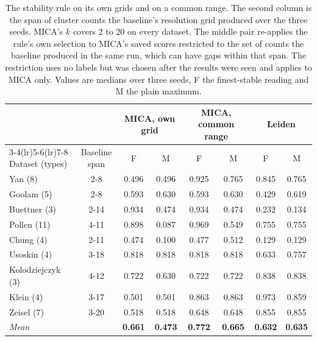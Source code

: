 \begin{table}[t]
\centering
\caption{The stability rule on its own grids and on a common range. The second column is the span of cluster counts the baseline's resolution grid produced over the three seeds. MICA's $k$ covers 2 to 20 on every dataset. The middle pair re-applies the rule's own selection to MICA's saved scores restricted to the set of counts the baseline produced in the same run, which can have gaps within that span. The restriction uses no labels but was chosen after the results were seen and applies to MICA only. Values are medians over three seeds, F the finest-stable reading and M the plain maximum.}
\label{tab:common}
\footnotesize
\setlength{\tabcolsep}{4pt}
\begin{tabular}{lccccccc}
\toprule
 & & \multicolumn{2}{c}{MICA, own grid} & \multicolumn{2}{c}{MICA, common range} & \multicolumn{2}{c}{Leiden} \\
\cmidrule(lr){3-4}\cmidrule(lr){5-6}\cmidrule(lr){7-8}
Dataset (types) & Baseline span & F & M & F & M & F & M \\
\midrule
Yan (8) & 2\textrm{-}8 & 0.496 & 0.496 & 0.925 & 0.765 & 0.845 & 0.765 \\
Goolam (5) & 2\textrm{-}8 & 0.593 & 0.630 & 0.593 & 0.630 & 0.429 & 0.619 \\
Buettner (3) & 2\textrm{-}14 & 0.934 & 0.474 & 0.934 & 0.474 & 0.232 & 0.134 \\
Pollen (11) & 4\textrm{-}11 & 0.898 & 0.087 & 0.969 & 0.549 & 0.755 & 0.755 \\
Chung (4) & 2\textrm{-}11 & 0.474 & 0.100 & 0.477 & 0.512 & 0.129 & 0.129 \\
Usoskin (4) & 3\textrm{-}18 & 0.818 & 0.818 & 0.818 & 0.818 & 0.633 & 0.757 \\
Kolodziejczyk (3) & 4\textrm{-}12 & 0.722 & 0.630 & 0.722 & 0.722 & 0.838 & 0.838 \\
Klein (4) & 3\textrm{-}17 & 0.501 & 0.501 & 0.863 & 0.863 & 0.973 & 0.859 \\
Zeisel (7) & 3\textrm{-}20 & 0.518 & 0.518 & 0.648 & 0.648 & 0.855 & 0.855 \\
\midrule
\textit{Mean} & & \textbf{0.661} & \textbf{0.473} & \textbf{0.772} & \textbf{0.665} & \textbf{0.632} & \textbf{0.635} \\
\bottomrule
\end{tabular}
\end{table}
